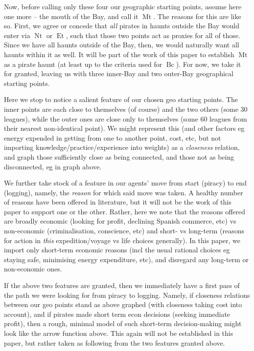 \documentclass{amsart}
\newcommand{\mention}[1]{\textit{#1}}%
\DeclareMathOperator{\mt}{Mt}%
\DeclareMathOperator{\bc}{Bc}%
\DeclareMathOperator{\et}{Et}%
\DeclareMathOperator{\nt}{Nt}%
\theoremstyle{definition}%
\theoremstyle{definition}%
\theoremstyle{remark}%
\begin{document}
Now, before calling only these four our geographic starting points, assume here one more -- the mouth of the Bay, and call it \(\mt\). The reasons for this are like so. First, we agree or concede that \emph{all} pirates in haunts outside the Bay would enter via \(\nt\) or \(\et\), such that those two points act as proxies for all of those. Since we have all haunts outside of the Bay, then, we would naturally want all haunts within it as well. It will be part of the work of this paper to establish \(\mt\) as a pirate haunt (at least up to the criteria used for \(\bc\)). For now, we take it for granted, leaving us with three inner-Bay and two outer-Bay geographical starting points.

Here we stop to notice a salient feature of our chosen geo starting points. The inner points are each close to themselves (of course) and the two others (some 30 leagues), while the outer ones are close only to themselves (some 60 leagues from their nearest non-identical point). We might represent this (and other factors eg energy expended in getting from one to another point, cost, etc, but not importing knowledge/practice/experience into weights) as a \mention{closeness} relation, and graph those sufficiently close as being connected, and those not as being disconnected, eg in graph above.

We further take stock of a feature in our agents' move from start (piracy) to end (logging), namely, the \emph{reason} for which said move was taken. A healthy number of reasons have been offered in literature, but it will not be the work of this paper to support one or the other. Rather, here we note that the reasons offered are broadly economic (looking for profit, declining Spanish commerce, etc) vs non-economic (criminalisation, conscience, etc) and short- vs long-term (reasons for action in \emph{this} expedition/voyage vs life choices generally). In this paper, we import only short-term economic reasons (incl the usual rational choices eg staying safe, minimising energy expenditure, etc), and disregard any long-term or non-economic ones.%

If the above two features are granted, then we immediately have a first pass of the path we were looking for from piracy to logging. Namely, if closeness relations between our geo points stand as above graphed (with closeness taking cost into account), and if pirates made short term econ decisions (seeking immediate profit), then a rough, minimal model of such short-term decision-making might look like the arrow function above. This again will not be established in this paper, but rather taken as following from the two features granted above.%
\end{document}
